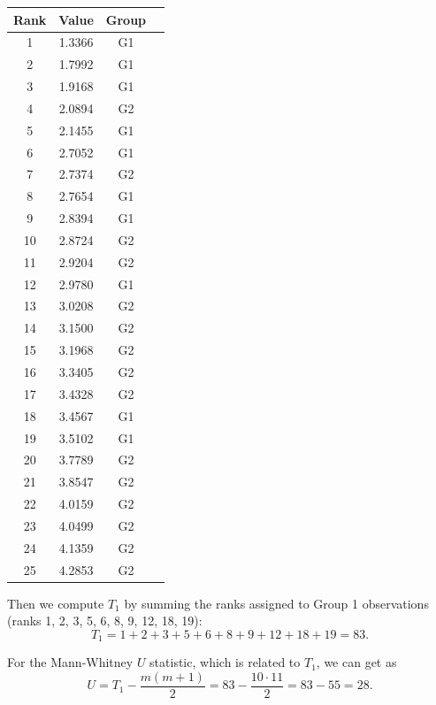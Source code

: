 \documentclass[letterpaper]{article}
\begin{document}
	\begin{center}
		\begin{tabular}{cccc}
			\hline
			Rank & Value & Group & \\
			\hline
			1  & 1.3366 & G1 \\
			2  & 1.7992 & G1 \\
			3  & 1.9168 & G1 \\
			4  & 2.0894 & G2 \\
			5  & 2.1455 & G1 \\
			6  & 2.7052 & G1 \\
			7  & 2.7374 & G2 \\
			8  & 2.7654 & G1 \\
			9  & 2.8394 & G1 \\
			10 & 2.8724 & G2 \\
			11 & 2.9204 & G2 \\
			12 & 2.9780 & G1 \\
			13 & 3.0208 & G2 \\
			14 & 3.1500 & G2 \\
			15 & 3.1968 & G2 \\
			16 & 3.3405 & G2 \\
			17 & 3.4328 & G2 \\
			18 & 3.4567 & G1 \\
			19 & 3.5102 & G1 \\
			20 & 3.7789 & G2 \\
			21 & 3.8547 & G2 \\
			22 & 4.0159 & G2 \\
			23 & 4.0499 & G2 \\
			24 & 4.1359 & G2 \\
			25 & 4.2853 & G2 \\
			\hline
		\end{tabular}
	\end{center}
	
	Then we compute $T_1$ by summing the ranks assigned to Group 1 observations (ranks 1, 2, 3, 5, 6, 8, 9, 12, 18, 19):
	$$T_1 = 1+2+3+5+6+8+9+12+18+19 = 83.$$
	
	For the Mann-Whitney $U$ statistic, which is related to $T_1$, we can get as
	$$U = T_1 - \frac{m(m+1)}{2} = 83 - \frac{10\cdot 11}{2} = 83 - 55 = 28.$$
	
\end{document}
